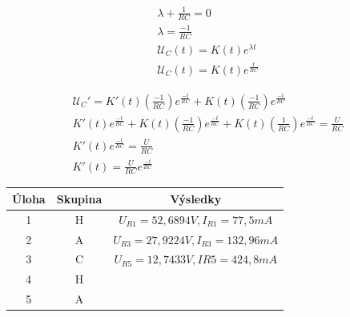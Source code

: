 \documentclass[12pt,a4paper]{article}
\begin{document}
  \begin{minipage}{\linewidth}
      \centering
      \begin{minipage}{0.45\linewidth}
          	\begin{align*}
       			\lambda + \frac{1}{RC} = 0  \\
       			\lambda = \frac{-1}{RC}  \\[5mm]
       			\mathcal{U}_C(t) = K(t)e^{\lambda t} \\
       			\mathcal{U}_C(t) = K(t)e^{\frac{t}{RC}}
		\end{align*}
      \end{minipage}
      \hspace{0.05\linewidth}
      \begin{minipage}{0.45\linewidth}
      	       	\begin{align*}
       			 \mathcal{U}_C'= K'(t)(\frac{-1}{RC})e^{\frac{-t}{RC}} + K(t)(\frac{-1}{RC})e^{\frac{-t}{RC}}  \\[5mm]
       			 K'(t)e^{\frac{-t}{RC}} + K(t)(\frac{-1}{RC})e^{\frac{-t}{RC}} + K(t)(\frac{1}{RC})e^{\frac{-t}{RC}} = \frac{U}{RC} \\
       			 K'(t)e^{\frac{-t}{RC}} = \frac{U}{RC} \\
       			 K'(t) = \frac{U}{RC}e^{\frac{-t}{RC}}
		\end{align*}
      \end{minipage}
  \end{minipage}
  
\newpage

\begin{center}
 \begin{tabular}{|c |c |c|} 
 \hline
 Úloha & Skupina & Výsledky\\ [0.5ex] 
 \hline\hline
 1 & H & $U_{R1} = 52,6894V, I_{R1} = 77,5mA $  \\ 
 \hline
 2 & A & $U_{R3} = 27,9224V, I_{R3} = 132,96mA$  \\
 \hline
 3 & C & $U_{R5} = 12,7433V, I{R5} = 424,8mA $ \\
 \hline
 4 & H & \\
 \hline
 5 & A & \\ [1ex] 
 \hline
\end{tabular}
\end{center}
\end{document}
